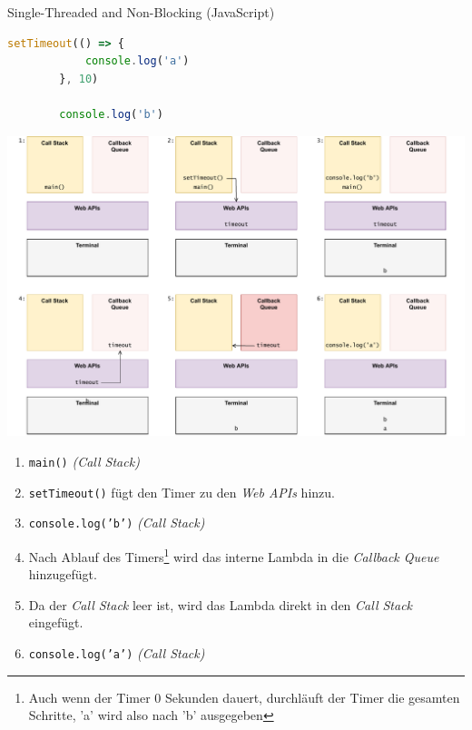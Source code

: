 \begin{example}{Single-Threaded and Non-Blocking (JavaScript)}
    \begin{lstlisting}[language=JavaScript]
        setTimeout(() => {
            console.log('a')
        }, 10)

        console.log('b')
    \end{lstlisting}

    \includegraphics[width=\textwidth]{includes/figures/example_stanb_2.pdf}

    \begin{enumerate}
        \item \texttt{main()} \emph{(Call Stack)}
        \item \texttt{setTimeout()} fügt den Timer zu den \emph{Web APIs} hinzu.
        \item \texttt{console.log('b')} \emph{(Call Stack)}
        \item Nach Ablauf des Timers\footnote{Auch wenn der Timer 0 Sekunden dauert, durchläuft der Timer die gesamten Schritte, 'a' wird also nach 'b' ausgegeben} wird das interne Lambda in die \emph{Callback Queue} hinzugefügt.
        \item Da der \emph{Call Stack} leer ist, wird das Lambda direkt in den \emph{Call Stack} eingefügt.
        \item \texttt{console.log('a')} \emph{(Call Stack)}
    \end{enumerate}
\end{example}

